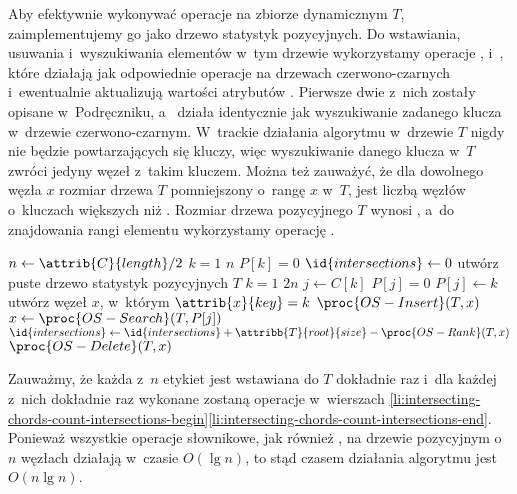 Aby efektywnie wykonywać operacje na zbiorze dynamicznym $T$, zaimplementujemy go jako drzewo statystyk pozycyjnych.
Do wstawiania, usuwania i~wyszukiwania elementów w~tym drzewie wykorzystamy operacje ,  i~, które działają jak odpowiednie operacje na drzewach czerwono-czarnych i~ewentualnie aktualizują wartości atrybutów .
Pierwsze dwie z~nich zostały opisane w~Podręczniku, a~ działa identycznie jak wyszukiwanie zadanego klucza w~drzewie czerwono-czarnym.
W~trackie działania algorytmu w~drzewie $T$ nigdy nie będzie powtarzających się kluczy, więc wyszukiwanie danego klucza w~$T$ zwróci jedyny węzeł z~takim kluczem.
Można też zauważyć, że dla dowolnego węzła $x$ rozmiar drzewa $T$ pomniejszony o~rangę $x$ w~$T$, jest liczbą węzłów o~kluczach większych niż .
Rozmiar drzewa pozycyjnego $T$ wynosi , a~do znajdowania rangi elementu wykorzystamy operację .
\begin{codebox}
\li $n\gets\attrib{C}{length}/2$
\li	\For $k=1$ \To $n$
\li		\Do $P[k]=0$
		\End
\li	$\id{intersections}\gets0$
\li	utwórz puste drzewo statystyk pozycyjnych $T$
\li	\For $k=1$ \To $2n$
\li		\Do $j\gets C[k]$
\li			\If $P[j]=0$
\li				\Then $P[j]\gets k$
\li					utwórz węzeł $x$, w~którym $\attrib{x}{key}=k$
\li					$\proc{OS-Insert}(T,x)$
\li				\Else $x\gets\proc{OS-Search}(T,P[j])$ \label{li:intersecting-chords-count-intersections-begin}
\li					$\id{intersections}\gets\id{intersections}+\attribb{T}{root}{size}-\proc{OS-Rank}(T,x)$
\li					$\proc{OS-Delete}(T,x)$
				\End \label{li:intersecting-chords-count-intersections-end}
		\End
\li	\Return {}
\end{codebox}

Zauważmy, że każda z~$n$ etykiet jest wstawiana do $T$ dokładnie raz i~dla każdej z~nich dokładnie raz wykonane zostaną operacje w~wierszach \ref{li:intersecting-chords-count-intersections-begin}\nbendash\ref{li:intersecting-chords-count-intersections-end}.
Ponieważ wszystkie operacje słownikowe, jak również , na drzewie pozycyjnym o~$n$ węzłach działają w~czasie $O(\lg n)$, to stąd czasem działania algorytmu jest $O(n\lg n)$.
